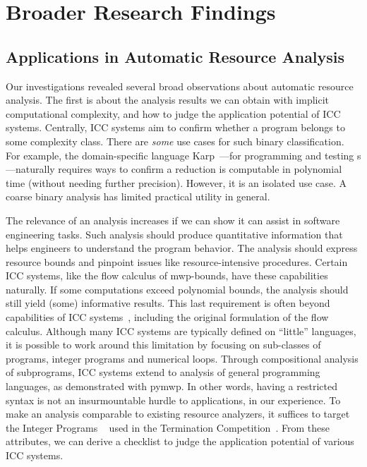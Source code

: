 \section{Broader Research Findings}
\label{sec:broader-findings}

\subsection{Applications in Automatic Resource Analysis}
\label{subsec:res-resource-analysis}

Our investigations revealed several broad observations about automatic resource analysis.
The first is about the analysis results we can obtain with implicit computational complexity, and how to judge the application potential of ICC systems.
Centrally, ICC systems aim to confirm whether a program belongs to some complexity class.
There are \emph{some} use cases for such binary classification.
For example, the domain-specific language Karp~\cite{zhang2022}---for programming and testing s---naturally requires ways to confirm a reduction is computable in polynomial time (without needing further precision).
However, it is an isolated use case.
A coarse binary analysis has limited practical utility in general.

The relevance of an analysis increases if we can show it can assist in software engineering tasks.
Such analysis should produce quantitative information that helps engineers to understand the program behavior.
The analysis should express resource bounds and pinpoint issues like resource-intensive procedures.
Certain ICC systems, like the flow calculus of mwp-bounds, have these capabilities naturally.
If some computations exceed polynomial bounds, the analysis should still yield (some) informative results.
This last requirement is often beyond capabilities of ICC systems~\cite{baillot2012}, including the original formulation of the flow calculus.
Although many ICC systems are typically defined on \enquote{little} languages, it is possible to work around this limitation by focusing on sub-classes of programs, \eg integer programs and numerical loops.
Through compositional analysis of subprograms, ICC systems extend to analysis of general programming languages, as demonstrated with pymwp.
In other words, having a restricted syntax is not an insurmountable hurdle to applications, in our experience.
To make an analysis comparable to existing resource analyzers, it suffices to target the  Integer Programs ~\cite{cinteger} used in the Termination Competition~\cite{giesl2019}.
From these attributes, we can derive a checklist to judge the application potential of various ICC systems.

